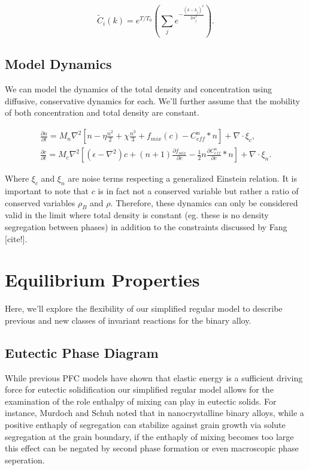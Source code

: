\documentclass[showkeys, prb, reprint]{revtex4-1}
\newcommand{\B}{\rho_B}
\renewcommand{\l}{\left}
\renewcommand{\r}{\right}
\newcommand{\f}{\frac}
\begin{document}
\begin{equation}
  \tilde{C}_i(k) = e^{T/T_0}\l(\sum_j e^{-\f{(k - k_j)^2}{2 \alpha_j^2}}\r).
\end{equation}

\subsection{Model Dynamics}

We can model the dynamics of the total density and concentration using
diffusive, conservative dynamics for each. We'll further assume that the
mobility of both concentration and total density are constant. 

\begin{gather}
	\f{\partial n}{\partial t} = M_{n} \nabla^2 \l[n - \eta \f{n^2}{2} + \chi \f{n^3}{3} + f_{mix}(c) - C^n_{eff} \ast n \r] + \nabla \cdot\xi_c, \\
	\f{\partial c}{\partial t} = M_{c} \nabla^2 \l[\l(\epsilon - \nabla^2\r)c + \l(n + 1\r)\f{\partial f_{mix}}{\partial c} - \f{1}{2} n \f{\partial C^n_{eff}}{\partial c} \ast n\r] + \nabla \cdot \xi_n.
\end{gather}

Where $\xi_c$ and $\xi_n$ are noise terms respecting a generalized Einstein
relation. It is important to note that $c$ is in fact not a conserved variable
but rather a ratio of conserved variables $\B$ and $\rho$. Therefore, these
dynamics can only be considered valid in the limit where total density is
constant (eg. these is no density segregation between phases) in addition to
the constraints discussed by Fang [cite!]. 

\section{Equilibrium Properties}

Here, we'll explore the flexibility of our simplified regular model to describe
previous and new classes of invariant reactions for the binary alloy.

\subsection{Eutectic Phase Diagram}

While previous PFC models have shown that elastic energy is a sufficient
driving force for eutectic solidification our simplified regular model allows
for the examination of the role enthalpy of mixing can play in eutectic solids.
For instance, Murdoch and Schuh noted that in nanocrystalline binary alloys,
while a positive enthaply of segregation can stabilize against grain growth via
solute segregation at the grain boundary, if the enthaply of mixing becomes too
large this effect can be negated by second phase formation or even macroscopic
phase seperation\cite{murdoch}. 
\end{document}
